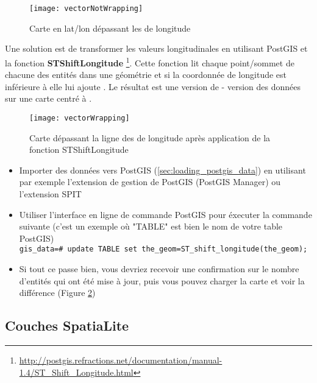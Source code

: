 \begin{figure}[ht]
   \begin{center}
   \caption{Carte en lat/lon dépassant les  de longitude \nixcaption}
   \label{fig:vector_not_wrapping}\smallskip
   \texttt{[image: vectorNotWrapping]}
\end{center}
\end{figure}

Une solution est de transformer les valeurs longitudinales en utilisant PostGIS et la fonction \textbf{ST\textunderscore Shift\textunderscore Longitude}
\footnote{\url{http://postgis.refractions.net/documentation/manual-1.4/ST_Shift_Longitude.html}}. Cette fonction lit chaque point/sommet de chacune des entités dans une géométrie et si la coordonnée de longitude est inférieure à  elle lui ajoute . Le résultat est une version de  -  version des données sur une carte centré à .

\begin{figure}[ht]
   \begin{center}
   \caption{Carte dépassant la ligne des  de longitude après application de la fonction ST\textunderscore Shift\textunderscore Longitude}
\label{fig:vector_wrapping}\smallskip
   \texttt{[image: vectorWrapping]}
\end{center}
\end{figure}


\begin{itemize}
\item Importer des données vers PostGIS (\ref{sec:loading_postgis_data}) en utilisant par exemple l'extension de gestion de PostGIS (PostGIS Manager) ou l'extension SPIT
\item Utiliser l'interface en ligne de commande PostGIS pour éxecuter la commande suivante (c'est un exemple où "TABLE" est bien le nom de votre table PostGIS) \\ 
\texttt{gis\_data=\# update TABLE set the\_geom=ST\_shift\_longitude(the\_geom);} 
\item Si tout ce passe bien, vous devriez recevoir une confirmation sur le nombre d'entités qui ont été mise à jour, puis vous pouvez charger la carte et voir la différence (Figure \ref{fig:vector_wrapping})
\end{itemize}

\subsection{Couches SpatiaLite} 
\label{label_spatialite} 

